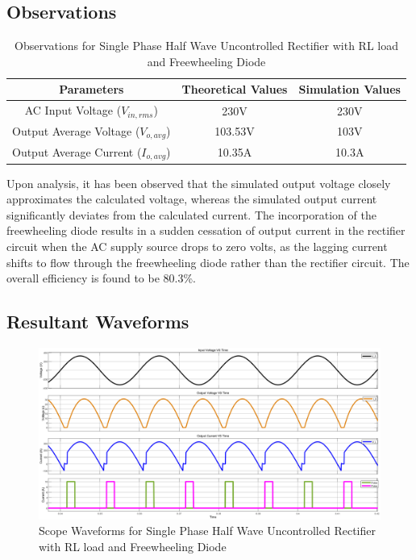 \subsection{Observations}

\begin{table}[h]
    \renewcommand{\arraystretch}{1.3}
    \label{table_observation_3}
    \centering
    \begin{tabular}{|c|c|c|}
        \hline
        Parameters                              & Theoretical Values & Simulation Values \\
        \hline
        \hline
        AC Input Voltage ($ V_{in,rms} $)       & 230V               & 230V              \\
        \hline
        Output Average Voltage ($ V_{o,avg} $)  & 103.53V            & 103V              \\
        \hline
        Output Average Current ($ I_{o,avg}  $) & 10.35A             & 10.3A             \\
        \hline
    \end{tabular}
    \caption{Observations for Single Phase Half Wave Uncontrolled Rectifier with RL load and Freewheeling Diode}

\end{table}



Upon analysis, it has been observed that the simulated output voltage closely approximates the calculated voltage, whereas the simulated output current significantly deviates from the calculated current. The incorporation of the freewheeling diode results in a sudden cessation of output current in the rectifier circuit when the AC supply source drops to zero volts, as the lagging current shifts to flow through the freewheeling diode rather than the rectifier circuit.
The overall efficiency is found to be 80.3\%.

\pagebreak

\subsection{Resultant Waveforms}


\begin{figure}[h]
    \centering
    \includegraphics[width=1\textwidth]{images/experiment-2/circuit-scope-simulation-03.png}
    \caption{Scope Waveforms for Single Phase Half Wave Uncontrolled Rectifier with RL load and Freewheeling Diode}
    \label{Fig_waveform_single-phase-full-wave-controlled-rectifier-with-RL-load}
\end{figure}


\pagebreak


